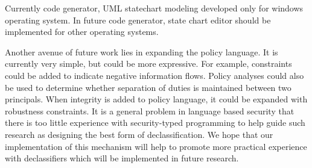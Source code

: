 Currently code generator, UML statechart modeling developed only for windows operating system. In future code generator, state chart editor should be implemented for other operating systems.

Another avenue of future work lies in expanding the policy
language. It is currently very simple, but could be more expressive. For example, constraints could be added to indicate negative information flows. Policy analyses could also be used to determine whether separation of duties is maintained between two principals. When integrity is added to policy language, it could be expanded with robustness constraints. It is a general problem in language based security that there is too little experience with security-typed programming to help guide such research as designing the best form of declassification. We hope that our implementation of this mechanism will help to promote more practical experience with declassifiers which will be implemented in future research.



